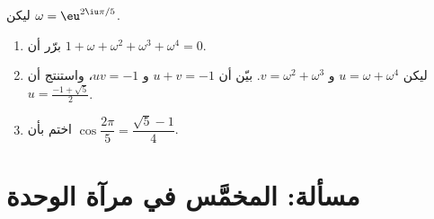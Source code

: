 \begin{exercise}[$\star\star\star$]\label{exo:g12:complex:10}
ليكن $\omega = \eu^{2\iu\pi/5}$.
\begin{enumerate}
  \item برّر أن $1 + \omega + \omega^2 + \omega^3 + \omega^4 = 0$.
  \item ليكن $u = \omega + \omega^4$ و $v = \omega^2 + \omega^3$. بيّن أن
        $u + v = -1$ و $uv = -1$، واستنتج أن $u = \frac{-1+\sqrt5}{2}$.
  \item اختم بأن $\cos\dfrac{2\pi}{5} = \dfrac{\sqrt5 - 1}{4}$.
\end{enumerate}
\end{exercise}

\section{مسألة: المخمَّس في مرآة الوحدة}

